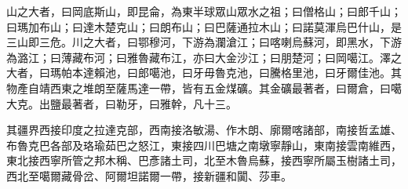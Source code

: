 \begin{pinyinscope}
山之大者，曰岡底斯山，即昆侖，為東半球眾山眾水之祖；曰僧格山；曰郎千山；曰瑪加布山；曰達木楚克山；曰朗布山；曰巴薩通拉木山；曰諾莫渾烏巴什山，是三山即三危。川之大者，曰鄂穆河，下游為瀾滄江；曰喀喇烏蘇河，即黑水，下游為潞江；曰薄藏布河；曰雅魯藏布江，亦曰大金沙江；曰朋楚河；曰岡噶江。澤之大者，曰瑪帕本達賴池，曰郎噶池，曰牙毋魯克池，曰騰格里池，曰牙爾佳池。其物產自靖西東之堆朗至薩馬達一帶，皆有五金煤礦。其金礦最著者，曰爾倉，曰噶大克。出鹽最著者，曰勒牙，曰雅幹，凡十三。

其疆界西接印度之拉達克部，西南接洛敏湯、作木朗、廓爾喀諸部，南接哲孟雄、布魯克巴各部及珞瑜茹巴之怒江，東接四川巴塘之南墩寧靜山，東南接雲南維西，東北接西寧所管之邦木稱、巴彥諸土司，北至木魯烏蘇，接西寧所屬玉樹諸土司，西北至噶爾藏骨岔、阿爾坦諾爾一帶，接新疆和闐、莎車。


\end{pinyinscope}